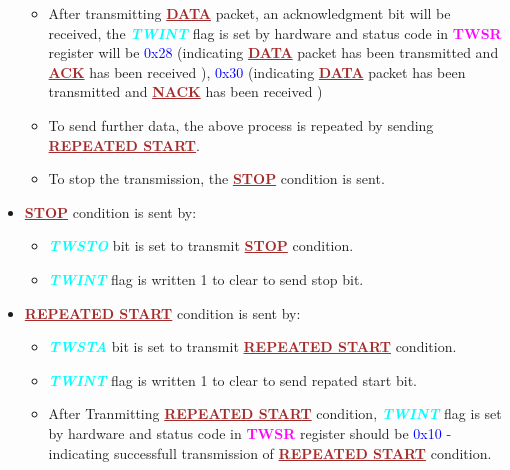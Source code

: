 \documentclass{article}
\newcommand{\bitFormat}[1]{\emph{\textbf{\textcolor{cyan}{#1}}}}
\newcommand{\regFormat}[1]{\textbf{\textcolor{magenta}{#1}}}
\newcommand{\iicFormat}[1]{\textbf{\textcolor{brown}{\underline{#1}}}}
\newcommand{\statusCode}[1]{{\textcolor{blue}{{ \LARGE #1}}}}
\begin{document}
\begin{itemize}
\begin{itemize}
        \item After transmitting \iicFormat{DATA} packet, an acknowledgment bit will be received, the \bitFormat{TWINT} flag is set by hardware and status code in \regFormat{TWSR} register will be \statusCode{0x28} (indicating  \iicFormat{DATA} packet has been transmitted and \iicFormat{ACK} has been received ), \statusCode{0x30} (indicating  \iicFormat{DATA} packet has been transmitted and \iicFormat{NACK} has been received )
    \end{itemize}
    \begin{itemize}
        \item To send further data, the above process is repeated by sending \iicFormat{REPEATED START}.
        \item To stop the transmission, the \iicFormat{STOP} condition is sent.
    \end{itemize}
    \item \iicFormat{STOP} condition is sent by:
    \begin{itemize}
        \item \bitFormat{TWSTO} bit is set to transmit \iicFormat{STOP} condition.
        \item \bitFormat{TWINT} flag is written 1 to clear to send stop bit.
    \end{itemize}
    \item \iicFormat{REPEATED START} condition is sent by:
    \begin{itemize}
        \item \bitFormat{TWSTA} bit is set to transmit \iicFormat{REPEATED START} condition.
        \item \bitFormat{TWINT} flag is written 1 to clear to send repated start bit.
        \item After Tranmitting \iicFormat{REPEATED START} condition, \bitFormat{TWINT} flag is set by hardware and status code in \regFormat{TWSR} register should be \statusCode{0x10} - indicating successfull transmission of \iicFormat{REPEATED START} condition.
    \end{itemize}
\end{itemize}
\end{document}
